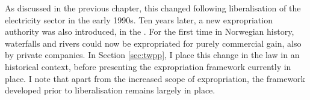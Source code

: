 %
%

As discussed in the previous chapter, this changed following liberalisation of the electricity sector in the early 1990s. Ten years later, a new expropriation authority was also introduced, in the \cite{wra00}. For the first time in Norwegian history, waterfalls and rivers could now be expropriated for purely commercial gain, also by private companies. In Section \ref{sec:twpp}, I place this change in the law in an historical context, before presenting the expropriation framework currently in place. I note that apart from the increased scope of expropriation, the framework developed prior to liberalisation remains largely in place.


